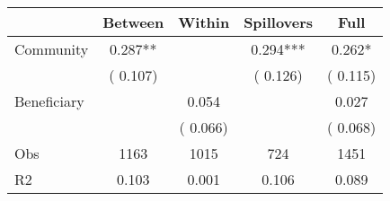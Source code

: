 
\begin{tabular}{l*{4}{c}}\hline&\multicolumn{1}{c}{Between}&\multicolumn{1}{c}{Within}&\multicolumn{1}{c}{Spillovers}&\multicolumn{1}{c}{Full}\\ \hline
 Community             &              0.287**      &                                               &        0.294*** &         0.262*                            \\ 
                               &        (       0.107)           &                                       &       (       0.126)     &      (       0.115)                                           \\ 
 Beneficiary   &                                               &        0.054    &                                &             0.027                            \\ 
                               &                                               & (       0.066)                  &                                        &      (       0.068)                                           \\ 
\hline                                                                                                                                                                                                                                            
 Obs                   &               1163               &       1015                       &       724                &              1451                                               \\ 
 R2                    &                      0.103              &              0.001                      &              0.106               &                     0.089                                              \\ 
\hline \end{tabular}                                                                                                                                                                                                              